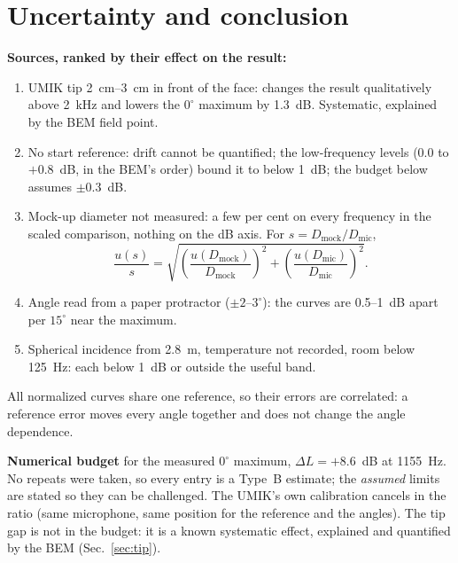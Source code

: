 \documentclass[a4paper,10pt]{article}
\begin{document}
\section{Uncertainty and conclusion}
\textbf{Sources, ranked by their effect on the result:}
\begin{enumerate}
\item UMIK tip \SIrange{2}{3}{cm} in front of the face: changes the result qualitatively above \SI{2}{kHz} and lowers the $0^\circ$ maximum by \SI{1.3}{dB}. Systematic, explained by the BEM field point.
\item No start reference: drift cannot be quantified; the low-frequency levels ($0.0$ to $+0.8$~dB, in the BEM's order) bound it to below \SI{1}{dB}; the budget below assumes $\pm0.3$~dB.
\item Mock-up diameter not measured: a few per cent on every frequency in the scaled comparison, nothing on the dB axis. For $s=D_{\mathrm{mock}}/D_{\mathrm{mic}}$,
\begin{equation}
\frac{u(s)}{s}=\sqrt{\left(\frac{u(D_{\mathrm{mock}})}{D_{\mathrm{mock}}}\right)^2+
\left(\frac{u(D_{\mathrm{mic}})}{D_{\mathrm{mic}}}\right)^2}.
\end{equation}
\item Angle read from a paper protractor ($\pm2$--$3^\circ$): the curves are 0.5--\SI{1}{dB} apart per $15^\circ$ near the maximum.
\item Spherical incidence from \SI{2.8}{m}, temperature not recorded, room below \SI{125}{Hz}: each below \SI{1}{dB} or outside the useful band.
\end{enumerate}
All normalized curves share one reference, so their errors are correlated: a reference
error moves every angle together and does not change the angle dependence.
\par\medskip\textbf{Numerical budget} for the measured $0^\circ$ maximum, $\Delta L=+8.6$~dB at
\SI{1155}{Hz}. No repeats were taken, so every entry is a Type~B estimate; the
\emph{assumed} limits are stated so they can be challenged. The UMIK's own calibration
cancels in the ratio (same microphone, same position for the reference and the angles).
The tip gap is not in the budget: it is a known systematic effect, explained and
quantified by the BEM (Sec.~\ref{sec:tip}).
\par\smallskip
\end{document}
